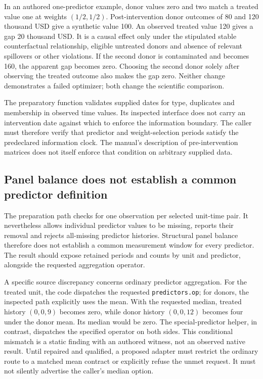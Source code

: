 In an authored one-predictor example, donor values zero and two match a
treated value one at weights $(1/2,1/2)$. Post-intervention donor outcomes
of 80 and 120 thousand USD give a synthetic value 100. An observed treated
value 120 gives a gap 20 thousand USD. It is a causal effect only under
the stipulated stable counterfactual relationship, eligible untreated
donors and absence of relevant spillovers or other violations. If the
second donor is contaminated and becomes 160, the apparent gap becomes
zero. Choosing the second donor solely after observing the treated outcome
also makes the gap zero. Neither change demonstrates a failed optimizer;
both change the scientific comparison.
\citep{exec24_synth_choice}

The preparatory function validates supplied dates for type, duplicates
and membership in observed time values. Its inspected interface does not
carry an intervention date against which to enforce the information
boundary. The caller must therefore verify that predictor and
weight-selection periods satisfy the predeclared information clock.
The manual's description of pre-intervention matrices does not itself
enforce that condition on arbitrary supplied data.
\citep{exec24_synth_source,v12_sw_synth}

\subsection{Panel balance does not establish a common predictor definition}
The preparation path checks for one observation per selected unit-time
pair. It nevertheless allows individual predictor values to be missing,
reports their removal and rejects all-missing predictor histories.
Structural panel balance therefore does not establish a common measurement
window for every predictor. The result should expose retained periods and
counts by unit and predictor, alongside the requested aggregation operator.
\citep{exec24_synth_source}

A specific source discrepancy concerns ordinary predictor aggregation.
For the treated unit, the code dispatches the requested
\texttt{predictors.op}; for donors, the inspected path explicitly uses
the mean. With the requested median, treated history $(0,0,9)$ becomes
zero, while donor history $(0,0,12)$ becomes four under the donor mean.
Its median would be zero. The special-predictor helper, in contrast,
dispatches the specified operator on both sides. This conditional mismatch
is a static finding with an authored witness, not an observed native
result. Until repaired and qualified, a proposed adapter must restrict
the ordinary route to a matched mean contract or explicitly refuse the
unmet request. It must not silently advertise the caller's median option.
\citep{exec24_synth_source,exec24_synth_choice}

